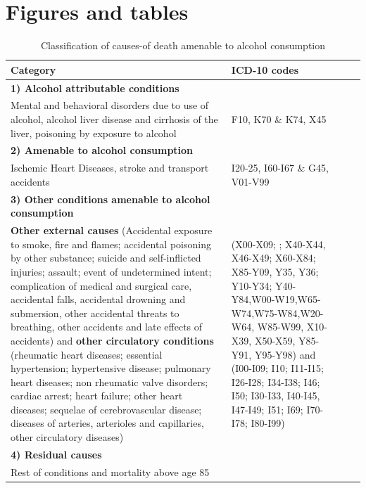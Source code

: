\documentclass{article}
\begin{document}
\newpage

 

\newpage

\section*{Figures and tables}

\begin{table}[h!]
\caption{Classification of causes-of death amenable to alcohol consumption}
\label{T1}
\begin{center}
 \begin{tabular}{p{10cm}p{6cm}cc}
\hline 
\textbf{Category} & \textbf{ICD-10 codes} \\ 
\hline 
\textbf{1) Alcohol attributable conditions} & \\
Mental and behavioral disorders due to use of alcohol, alcohol liver disease and cirrhosis of the liver, poisoning by exposure to alcohol&F10, K70 \& K74, X45\\
\hline 
\textbf{2) Amenable to alcohol consumption} & \\
Ischemic Heart Diseases, stroke and transport accidents & I20-25, I60-I67 \& G45, V01-V99\\
\hline 
\textbf{3) Other conditions amenable to alcohol consumption} & \\
\textbf{Other external causes} (Accidental exposure to smoke, fire and flames; accidental poisoning by other substance; suicide and self-inflicted injuries; assault; event of undetermined intent; complication of medical and surgical care, accidental falls, accidental drowning and submersion, other accidental threats to breathing, other accidents and late effects of accidents) and \textbf{other circulatory conditions} (rheumatic heart diseases; essential hypertension; hypertensive disease; pulmonary heart diseases; non rheumatic valve disorders; cardiac arrest; heart failure; other heart diseases; sequelae of cerebrovascular disease; diseases of arteries, arterioles and capillaries, other circulatory diseases)  &  (X00-X09; ; X40-X44, X46-X49; X60-X84; X85-Y09, Y35, Y36; Y10-Y34; Y40-Y84,W00-W19,W65-W74,W75-W84,W20-W64, W85-W99, X10-X39, X50-X59, Y85-Y91, Y95-Y98) and (I00-I09; I10; I11-I15; I26-I28; I34-I38; I46; I50; I30-I33, I40-I45, I47-I49; I51; I69; I70-I78; I80-I99)\\
\hline 
\textbf{4) Residual causes} & \\
Rest of conditions and mortality above age 85  &\\
\hline 
\end{tabular} 
\end{center}
\end{table}
\end{document}
